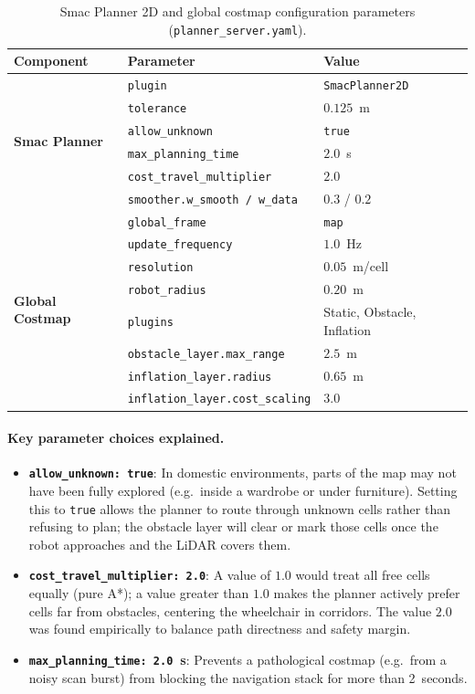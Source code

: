 \begin{table}[H]
\centering
\caption{Smac Planner 2D and global costmap configuration parameters (\texttt{planner\_server.yaml}).}
\label{tab:planner_yaml}
\renewcommand{\arraystretch}{1.2}
\begin{tabular}{lll}
\toprule
\textbf{Component} & \textbf{Parameter} & \textbf{Value} \\
\midrule
\multirow{6}{*}{\textbf{Smac Planner}} 
 & \texttt{plugin} & \texttt{SmacPlanner2D} \\
 & \texttt{tolerance} & $0.125$~m \\
 & \texttt{allow\_unknown} & \texttt{true} \\
 & \texttt{max\_planning\_time} & $2.0$~s \\
 & \texttt{cost\_travel\_multiplier} & $2.0$ \\
 & \texttt{smoother.w\_smooth / w\_data} & $0.3$ / $0.2$ \\
\midrule
\multirow{8}{*}{\textbf{Global Costmap}}
 & \texttt{global\_frame} & \texttt{map} \\
 & \texttt{update\_frequency} & $1.0$~Hz \\
 & \texttt{resolution} & $0.05$~m/cell \\
 & \texttt{robot\_radius} & $0.20$~m \\
 & \texttt{plugins} & Static, Obstacle, Inflation \\
 & \texttt{obstacle\_layer.max\_range} & $2.5$~m \\
 & \texttt{inflation\_layer.radius} & $0.65$~m \\
 & \texttt{inflation\_layer.cost\_scaling} & $3.0$ \\
\bottomrule
\end{tabular}
\end{table}

\paragraph{Key parameter choices explained.}
\begin{itemize}\itemsep=2pt
    \item \textbf{\texttt{allow\_unknown: true}}: In domestic environments, parts of the map may not have been fully explored (e.g.\ inside a wardrobe or under furniture). Setting this to \texttt{true} allows the planner to route through unknown cells rather than refusing to plan; the obstacle layer will clear or mark those cells once the robot approaches and the LiDAR covers them.
    \item \textbf{\texttt{cost\_travel\_multiplier: 2.0}}: A value of $1.0$ would treat all free cells equally (pure A*); a value greater than $1.0$ makes the planner actively prefer cells far from obstacles, centering the wheelchair in corridors. The value $2.0$ was found empirically to balance path directness and safety margin.
    \item \textbf{\texttt{max\_planning\_time: 2.0}~s}: Prevents a pathological costmap (e.g.\ from a noisy scan burst) from blocking the navigation stack for more than 2~seconds.
\end{itemize}

